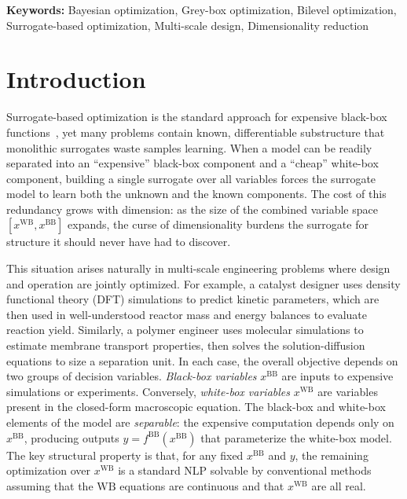 \documentclass[12pt,a4paper]{article}%
\theoremstyle{plain}%
\theoremstyle{remark}%
\theoremstyle{definition}%
\def\WB{\mathrm{WB}}
\def\BB{\mathrm{BB}}
\begin{document}
\noindent\textbf{Keywords:} Bayesian optimization, Grey-box optimization, Bilevel optimization, Surrogate-based optimization, Multi-scale design, Dimensionality reduction

\section{Introduction}\label{sec:introduction}

Surrogate-based optimization is the standard approach for expensive black-box functions~\cite{frazier2018tutorial}, yet many problems contain known, differentiable substructure that monolithic surrogates waste samples learning. When a model can be readily separated into an ``expensive'' black-box component and a ``cheap'' white-box component, building a single surrogate over all variables forces the surrogate model to learn both the unknown and the known components. The cost of this redundancy grows with dimension: as the size of the combined variable space $[x^{\WB}, x^{\BB}]$ expands, the curse of dimensionality burdens the surrogate for structure it should never have had to discover.

This situation arises naturally in multi-scale engineering problems where design and operation are jointly optimized. For example, a catalyst designer uses density functional theory (DFT) simulations to predict kinetic parameters, which are then used in well-understood reactor mass and energy balances to evaluate reaction yield. Similarly, a polymer engineer uses molecular simulations to estimate membrane transport properties, then solves the solution-diffusion equations to size a separation unit. In each case, the overall objective depends on two groups of decision variables. \emph{Black-box variables} $x^{\BB}$ are inputs to expensive simulations or experiments. Conversely, \emph{white-box variables} $x^{\WB}$ are variables present in the closed-form macroscopic equation. The black-box and white-box elements of the model are \emph{separable}: the expensive computation depends only on $x^{\BB}$, producing outputs $y = f^{\BB}(x^{\BB})$ that parameterize the white-box model. The key structural property is that, for any fixed $x^{\BB}$ and $y$, the remaining optimization over $x^{\WB}$ is a standard NLP solvable by conventional methods assuming that the $\WB$ equations are continuous and that $x^{\WB}$ are all real.
\end{document}
